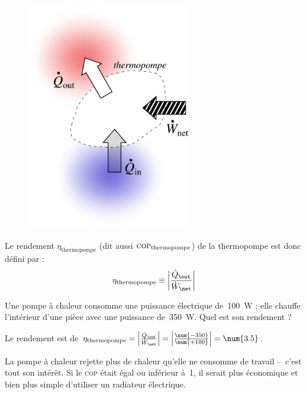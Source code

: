 		\begin{figure}
			\begin{center}
				\includegraphics[height=10cm]{images/efficacite_thermopompe.png}
			\end{center}
			\label{fig_transferts_thermopompe}
		\end{figure}

		Le rendement $\eta_\text{thermopompe}$ (dit aussi $\textsc{cop}_\text{thermopompe}$) de la thermopompe est donc défini par :
		\begin{equation}
			\eta_\text{thermopompe} \equiv \left| \frac{\dot Q_\out}{\dot W_\net} \right|
			\label{def_rendement_thermopompe}
		\end{equation}
	
			\begin{anexample}
				Une pompe à chaleur consomme une puissance électrique de~\SI{100}{\watt} ; elle chauffe l’intérieur d’une pièce avec une puissance de~\SI{350}{\watt}. Quel est son rendement ?
		
				\begin{answer}
					Le rendement est de $\eta_\text{thermopompe} = \left| \frac{\dot Q_\out}{\dot W_\net} \right| = \left| \frac{\num{-350}}{\num{+100}} \right| = \num{3.5}$.
						\begin{remark} La pompe à chaleur rejette plus de chaleur qu’elle ne consomme de travail –\ c’est tout son intérêt. Si le \textsc{cop} était égal ou inférieur à~\num{1}, il serait plus économique et bien plus simple d’utiliser un radiateur électrique.\end{remark}
				\end{answer}
			\end{anexample}


